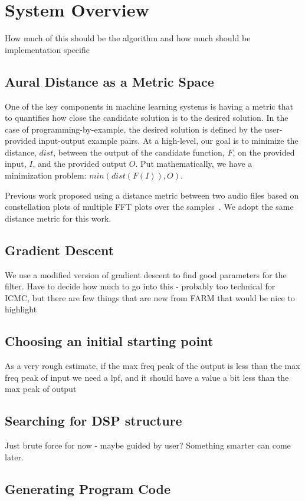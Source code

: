 \section{System Overview}

How much of this should be the algorithm and how much should be implementation specific


\subsection{Aural Distance as a Metric Space}

One of the key components in machine learning systems is having a metric that to quantifies how close the candidate solution is to the desired solution.
In the case of programming-by-example, the desired solution is defined by the user-provided input-output example pairs.
At a high-level, our goal is to minimize the distance, $dist$, between the output of the candidate function, $F$, on the provided input, $I$, and the provided output $O$.
Put mathematically, we have a minimization problem: $min (dist ( F(I)), O)$.

Previous work proposed using a distance metric between two audio files based on constellation plots of multiple FFT plots over the samples~\cite{SantolucitoFARM}.
We adopt the same distance metric for this work.

\subsection{Gradient Descent}

We use a modified version of gradient descent to find good parameters for the filter.
Have to decide how much to go into this - probably too technical for ICMC, but there are few things that are new from FARM that would be nice to highlight

\subsection{Choosing an initial starting point}

As a very rough estimate, if the max freq peak of the output is less than the max freq peak of input
  we need a lpf, and it should have a value a bit less than the max peak of output

\subsection{Searching for DSP structure}

Just brute force for now - maybe guided by user? 
Something smarter can come later.

\subsection{Generating Program Code}


